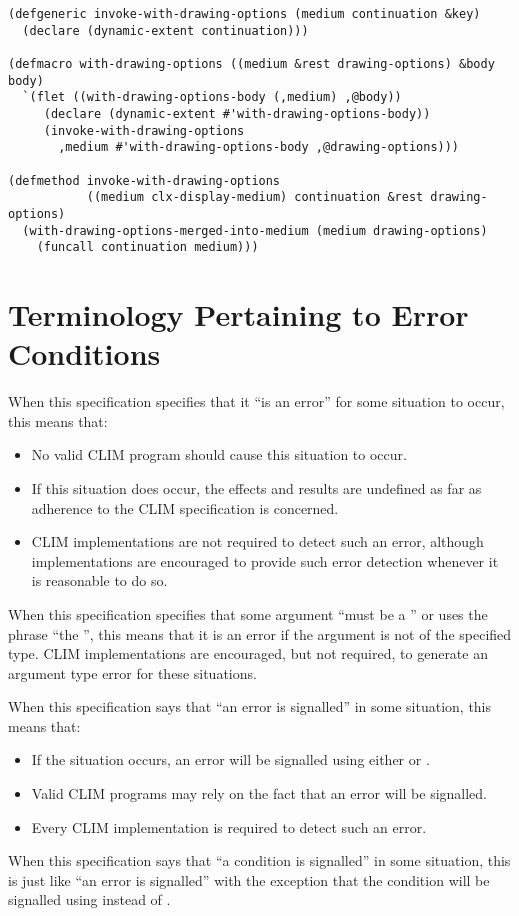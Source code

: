\begin{verbatim}
(defgeneric invoke-with-drawing-options (medium continuation &key)
  (declare (dynamic-extent continuation)))

(defmacro with-drawing-options ((medium &rest drawing-options) &body body)
  `(flet ((with-drawing-options-body (,medium) ,@body))
     (declare (dynamic-extent #'with-drawing-options-body))
     (invoke-with-drawing-options
       ,medium #'with-drawing-options-body ,@drawing-options)))

(defmethod invoke-with-drawing-options 
           ((medium clx-display-medium) continuation &rest drawing-options)
  (with-drawing-options-merged-into-medium (medium drawing-options)
    (funcall continuation medium)))
\end{verbatim}


\section {Terminology Pertaining to Error Conditions}

When this specification specifies that it ``is an error'' for some situation to
occur, this means that:

\begin{itemize}
\item No valid CLIM program should cause this situation to occur.

\item If this situation does occur, the effects and results are undefined as
far as adherence to the CLIM specification is concerned.

\item CLIM implementations are not required to detect such an error, although
implementations are encouraged to provide such error detection whenever it is
reasonable to do so.
\end{itemize}

When this specification specifies that some argument ``must be a ''
or uses the phrase ``the  '', this means that it is an
error if the argument is not of the specified type.  CLIM implementations are
encouraged, but not required, to generate an argument type error for these
situations.

When this specification says that ``an error is signalled'' in some situation,
this means that:

\begin{itemize}
\item If the situation occurs, an error will be signalled using either
 or .

\item Valid CLIM programs may rely on the fact that an error will be signalled.

\item Every CLIM implementation is required to detect such an error.
\end{itemize}

When this specification says that ``a condition is signalled'' in some
situation, this is just like ``an error is signalled'' with the exception that
the condition will be signalled using  instead of .
